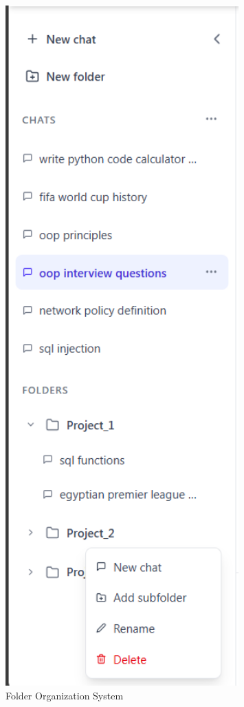 \begin{figure}[h]
    \centering
    \includegraphics[width=0.8\textwidth]{./Chapter07/figures/folder_organization_ui.png}
    \caption{Folder Organization System}
    \label{fig:folder-organization-ui}
\end{figure}

